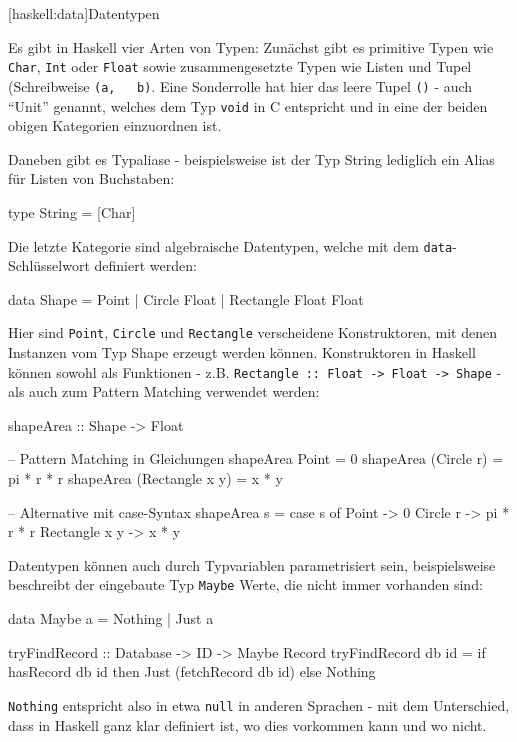 \documentclass[11pt, a4paper, bibgerm]{scrbook}
\newcommand\icode[1]{\lstinline?#1?}
\newcommand\lsection{}
\begin{document}
\lsection[haskell:data]{Datentypen}

Es gibt in Haskell vier Arten von Typen: Zunächst gibt es primitive
Typen wie \icode{Char}, \icode{Int} oder \icode{Float} sowie
zusammengesetzte Typen wie Listen und Tupel (Schreibweise \icode{(a,
  b)}. Eine Sonderrolle hat hier das leere Tupel \icode{()} - auch
"`Unit"' genannt, welches dem Typ \icode{void} in C entspricht und in
eine der beiden obigen Kategorien einzuordnen ist.

Daneben gibt es Typaliase - beispielsweise ist der Typ String lediglich
ein Alias für Listen von Buchstaben:
\begin{code}
type String = [Char]
\end{code}

Die letzte Kategorie sind algebraische Datentypen, welche mit dem
\icode{data}-Schlüsselwort definiert werden:
\begin{code}
data Shape = Point
           | Circle Float
           | Rectangle Float Float
\end{code}
Hier sind \icode{Point}, \icode{Circle} und \icode{Rectangle}
verscheidene Konstruktoren, mit denen Instanzen vom Typ Shape erzeugt
werden können. Konstruktoren in Haskell können sowohl als Funktionen -
z.B. \icode{Rectangle :: Float -> Float -> Shape} - als auch zum Pattern
Matching verwendet werden:
\begin{code}
shapeArea :: Shape -> Float

-- Pattern Matching in Gleichungen
shapeArea Point           = 0
shapeArea (Circle r)      = pi * r * r
shapeArea (Rectangle x y) = x * y

-- Alternative mit case-Syntax
shapeArea s = case s of
                Point         -> 0
                Circle r      -> pi * r * r
                Rectangle x y -> x * y
\end{code}

Datentypen können auch durch Typvariablen parametrisiert sein,
beispielsweise beschreibt der eingebaute Typ \icode{Maybe} Werte, die
nicht immer vorhanden sind:
\begin{code}
data Maybe a = Nothing | Just a

tryFindRecord :: Database -> ID -> Maybe Record
tryFindRecord db id = if hasRecord db id
                      then
                        Just (fetchRecord db id)
                      else
                        Nothing
\end{code}
\icode{Nothing} entspricht also in etwa \icode{null} in anderen Sprachen
- mit dem Unterschied, dass in Haskell ganz klar definiert ist, wo dies
vorkommen kann und wo nicht.
\end{document}
